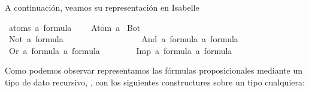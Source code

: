 \begin{isabellebody}
\begin{isamarkuptext}
  A continuación, veamos su representación en Isabelle%
\end{isamarkuptext}\isamarkuptrue%
\isamarkupfalse%
\ {\isacharparenleft}atoms{\isacharcolon}\ {\isacharprime}a{\isacharparenright}\ formula\ {\isacharequal}\ \isanewline
\ \ Atom\ {\isacharprime}a\isanewline
{\isacharbar}\ Bot\ \ \ \ \ \ \ \ \ \ \ \ \ \ \ \ \ \ \ \ \ \ \ \ \ \ \ \ \ \ {\isacharparenleft}{\isachardoublequoteopen}{\isasymbottom}{\isachardoublequoteclose}{\isacharparenright}\ \ \isanewline
{\isacharbar}\ Not\ {\isachardoublequoteopen}{\isacharprime}a\ formula{\isachardoublequoteclose}\ \ \ \ \ \ \ \ \ \ \ \ \ \ \ \ \ {\isacharparenleft}{\isachardoublequoteopen}\isactrlbold {\isasymnot}{\isachardoublequoteclose}{\isacharparenright}\isanewline
{\isacharbar}\ And\ {\isachardoublequoteopen}{\isacharprime}a\ formula{\isachardoublequoteclose}\ {\isachardoublequoteopen}{\isacharprime}a\ formula{\isachardoublequoteclose}\ \ \ \ {\isacharparenleft}\ {\isachardoublequoteopen}\isactrlbold {\isasymand}{\isachardoublequoteclose}\ {}{}{\isacharparenright}\isanewline
{\isacharbar}\ Or\ {\isachardoublequoteopen}{\isacharprime}a\ formula{\isachardoublequoteclose}\ {\isachardoublequoteopen}{\isacharprime}a\ formula{\isachardoublequoteclose}\ \ \ \ \ {\isacharparenleft}\ {\isachardoublequoteopen}\isactrlbold {\isasymor}{\isachardoublequoteclose}\ {}{}{\isacharparenright}\isanewline
{\isacharbar}\ Imp\ {\isachardoublequoteopen}{\isacharprime}a\ formula{\isachardoublequoteclose}\ {\isachardoublequoteopen}{\isacharprime}a\ formula{\isachardoublequoteclose}\ \ \ \ {\isacharparenleft}\ {\isachardoublequoteopen}\isactrlbold {\isasymrightarrow}{\isachardoublequoteclose}\ {}{}{\isacharparenright}%
\begin{isamarkuptext}%
Como podemos observar representamos las fórmulas proposicionales
  mediante un tipo de dato recursivo, , con los 
  siguientes constructures sobre un tipo  cualquiera:


\end{isamarkuptext}
\end{isabellebody}

